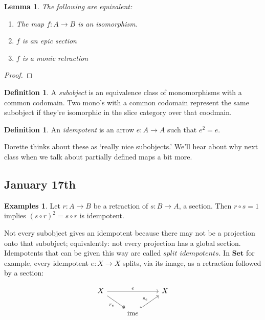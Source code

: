 \documentclass[11pt]{amsart}
\theoremstyle{plain}
\newtheorem{lem}[thm]{Lemma}
\theoremstyle{definition}
\newtheorem{defn}[thm]{Definition}
\newtheorem*{egs*}{Examples}
\newcommand{\im}{\text{im}}
\newcommand{\Set}{{\mathbf{Set}}}
\newcommand{\noi}{{\noindent}}
\begin{document}
\begin{lem}
The following are equivalent: 
\begin{enumerate}[label=(\alph*)]
\item The map $f : A \to B$ is an isomorphism. 
\item $f$ is an epic section 
\item $f$ is a monic retraction 
\end{enumerate}
\end{lem}
\begin{proof}
\end{proof}

\begin{defn}
A \textit{subobject} is an equivalence class of monomorphisms with a common codomain. Two mono's with a common codomain represent the same subobject if they're isomorphic in the slice category over that coodmain. 
\end{defn}



\begin{defn}
An \textit{idempotent} is an arrow $e : A \to A$ such that $e^2 = e$.
\end{defn}

\noi Dorette thinks about these as `really nice subobjects.'  We'll hear about why next class when we talk about partially defined maps a bit more. 

\subsection{January 17th}

\begin{egs*}
Let $r : A \to B$ be a retraction of $s: B \to A$, a section. Then $r \circ s = 1$ implies $ (s \circ r)^2 = s \circ r$ is idempotent. 
\end{egs*}

\noi Not every subobject gives an idempotent because there may not be a projection onto that subobject; equivalently: not every projection has a global section. Idempotents that can be given this way are called $\textit{split idempotents}$. In $\Set$ for example, every idempotent $e : X \to X$ splits, via its image, as a retraction followed by a section: 

\[ \begin{tikzcd} 
  X \rar[rr, "e"] \ar[dr,two heads, "r_e"'] && X \\
  & \im e  \ar[ur, hookrightarrow, "s_e"]
\end{tikzcd}\]
\end{document}
